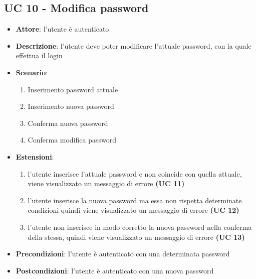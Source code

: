 \subsection{UC 10 - Modifica password}
\begin{itemize}
    \item \textbf{Attore}: l’utente è autenticato
    \item \textbf{Descrizione}: l’utente deve poter modificare l’attuale password, con la quale effettua il login
    \item \textbf{Scenario}: 
            \begin{enumerate}
                \item Inserimento password attuale
                \item Inserimento nuova password
                \item Conferma nuova password
                \item Conferma modifica password
            \end{enumerate}
    \item \textbf{Estensioni}: 
    \begin{enumerate}
        \item l’utente inserisce l’attuale password e non coincide con quella attuale, viene visualizzato un messaggio di errore \textbf{(UC 11)}
        \item l’utente inserisce la nuova password ma essa non rispetta determinate condizioni quindi viene visualizzato un messaggio di errore \textbf{(UC 12)}
        \item l’utente non inserisce in modo corretto la nuova password nella conferma della stessa, quindi viene visualizzato un messaggio di errore \textbf{(UC 13)}
    \end{enumerate}
    \item \textbf{Precondizioni}: l’utente è autenticato con una determinata password
    \item \textbf{Postcondizioni}: l’utente è autenticato con una nuova password
\end{itemize}

